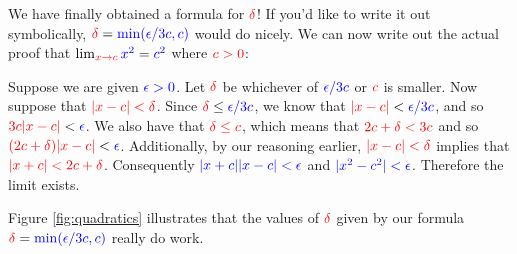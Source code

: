 \documentclass{myarticle}
\newcommand{\hor}[1]{\textcolor{red}{#1}}
\newcommand{\ver}[1]{\textcolor{blue}{#1}}
\theoremstyle{nospace}
\newtheorem{old series theorem}{Theorem}
\newenvironment{series theorem}
{\begin{mdframed}\begin{old series theorem}}
    {\end{old series theorem}\end{mdframed}}
\begin{document}
We have finally obtained a formula for $\hor{\delta}$! If you'd like
to write it out symbolically,
$\hor{\delta} = \ver{\min(\epsilon/3c, c)}$ would do nicely. We can
now write out the actual proof that
$\lim_{\hor{x \to c}} \ver{x^2} = \ver{c^2}$ where $\hor{c > 0}$:

\begin{mdframed}
  Suppose we are given $\ver{\epsilon > 0}$. Let $\hor{\delta}$ be
  whichever of $\ver{\epsilon/3c}$ or $\hor{c}$ is smaller. Now
  suppose that $\hor{|x - c| < \delta}$. Since
  $\hor{\delta} \leq \ver{\epsilon/3c}$, we know that
  $\hor{|x - c|} < \ver{\epsilon/3c}$, and so
  $\hor{3c|x - c|} < \ver{\epsilon}$. We also have that
  $\hor{\delta \leq c}$, which means that $\hor{2c + \delta < 3c}$ and
  so $\hor{(2c + \delta)|x - c|} < \ver{\epsilon}$. Additionally, by
  our reasoning earlier, $\hor{|x - c| < \delta}$ implies that
  $\hor{|x + c| < 2c + \delta}$. Consequently
  $\ver{|x + c||x - c| < \epsilon}$ and
  $\ver{|x^2 - c^2| < \epsilon}$. Therefore the limit exists.
\end{mdframed}

Figure \ref{fig:quadratics} illustrates that the values of
$\hor{\delta}$ given by our formula
$\hor{\delta} = \ver{\min(\epsilon/3c, c)}$ really do work.
\end{document}
